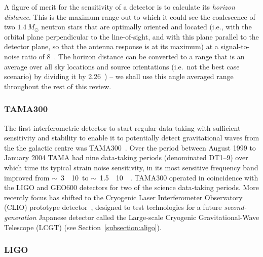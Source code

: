 A figure of merit for the sensitivity of a detector is to calculate
its \textit{horizon distance}. This is the maximum range out to which
it could see the coalescence of two $1.4\,M_{\odot}$ neutron stars
that are optimally oriented and located (i.e., with the orbital plane
perpendicular to the line-of-sight, and with this plane parallel to
the detector plane, so that the antenna response is at its maximum) at
a signal-to-noise ratio of 8~\cite{Abbott:2005b}. The horizon distance
can be converted to a range that is an average over all sky locations
and source orientations (i.e.\, not the best case scenario) by dividing
it by 2.26~\cite{Sutton:2003}) -- we shall use this angle averaged
range throughout the rest of this review.

\subsubsection{TAMA300}


The first interferometric detector to start regular data taking with sufficient
sensitivity and stability to enable it to potentially detect gravitational waves
from the the galactic centre was TAMA300~\cite{Ando:2001}. Over the period
between August 1999 to January 2004 TAMA had nine data-taking periods
(denominated DT1--9) over which time its typical strain noise sensitivity, in
its most sensitive frequency band improved from
$\sim$~3~\texttimes~10~\Hz to
$\sim$~1.5~\texttimes~10~\Hz~\cite{Akutsu:2006}. TAMA300
operated in coincidence with the LIGO and GEO600 detectors for two of
the science data-taking periods. More recently focus has shifted to
the Cryogenic Laser Interferometer Observatory (CLIO) prototype
detector~\cite{Yamamoto:2008, CLIOweb}, designed to test technologies
for a future \textit{second-generation} Japanese detector called the
Large-scale Cryogenic Gravitational-Wave Telescope (LCGT) (see
Section~\ref{subsection:aligo}).


\subsubsection{LIGO}
\label{sec:ligoruns} 

